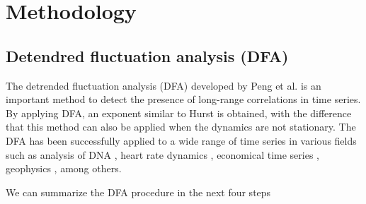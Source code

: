 \documentclass[onecolumn, preprint,aps,amsmath, amssymb, superscriptaddress]{revtex4}
\begin{document}





\section{Methodology}
\label{sec:method}
\subsection{Detendred fluctuation analysis (DFA)}

The detrended fluctuation analysis (DFA) developed by Peng et al. \cite{Peng} is an important method  to detect the presence of long-range correlations in time series. By applying DFA, an exponent similar to Hurst is obtained, with the difference that this method can also be applied when the dynamics are not stationary. The DFA has been successfully applied to a wide range of time series in various fields such as  analysis of DNA \cite{Buldyrev, Buldyrev_1, Jaroszewicz}, heart rate dynamics \cite{Peng_1, Viswanathan, Echeverria}, economical time series \cite{Cizeau, Jaroszewicz_1, Mariani, Mariani_1, Mariani_2}, geophysics \cite{Ribeiro}, among others.

We can summarize the DFA procedure in the next four steps
\end{document}
